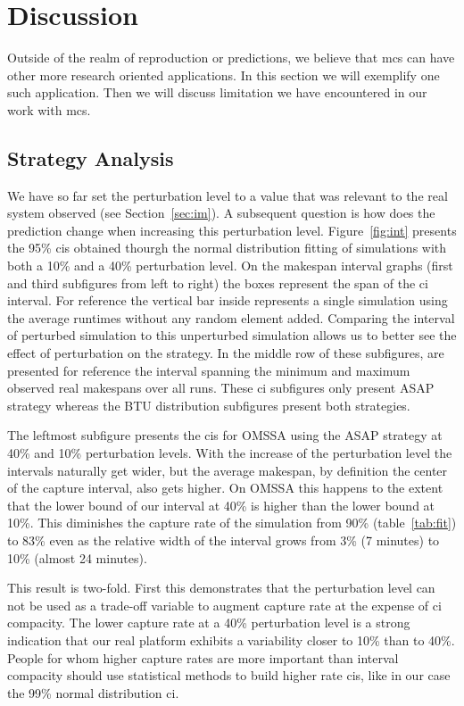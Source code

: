 \documentclass[10pt,conference,compsocconf]{IEEEtran}
\begin{document}
\section{Discussion}
\label{sec:disc}
Outside of the realm of reproduction or predictions, we believe that \ac{mcs}
can have other more research oriented applications. In this section we will
exemplify one such application. Then we will discuss limitation we have
encountered in our work with \ac{mcs}.

\subsection{Strategy Analysis}\label{sec:sa}

We have so  far set the perturbation level  to a value that was  relevant to the
real system observed  (see Section~\ref{sec:im}).  A subsequent  question is how
does   the  prediction   change   when  increasing   this  perturbation   level.
Figure~\ref{fig:int} presents the 95\% \acp{ci} obtained thourgh the normal
distribution fitting of simulations with both a 10\%
and a 40\% perturbation  level. On the makespan interval graphs  (first and third
subfigures  from left  to right)  the boxes  represent the  span of the \ac{ci}
interval. For reference  the vertical bar inside represents  a single simulation
using  the average  runtimes without  any random  element added.   Comparing the
interval of  perturbed simulation  to this unperturbed  simulation allows  us to
better see  the effect of  perturbation on the strategy.   In the middle  row of
these subfigures, are presented for  reference the interval spanning the minimum
and maximum  observed real  makespans over all  runs.  These  \ac{ci} subfigures
only present ASAP strategy whereas  the BTU distribution subfigures present both
strategies.

The leftmost subfigure presents the \acp{ci} for OMSSA using the ASAP strategy at
40\% and 10\% perturbation levels. With the increase of the perturbation level
the intervals naturally get wider, but the average makespan, by definition the
center of the capture interval, also gets higher. On OMSSA this happens to the
extent that the lower bound of our interval at 40\% is higher than the lower
bound at 10\%. This diminishes the capture rate of the simulation from 90\%
(table~\ref{tab:fit}) to 83\% even as the relative width of the interval grows
from 3\% (7 minutes) to 10\% (almost 24 minutes).

This result is two-fold. First this demonstrates that the perturbation level can
not be used as a trade-off variable to augment capture rate at the expense of
\ac{ci} compacity. The lower capture rate at a 40\% perturbation level is a
strong indication that our real platform exhibits a variability closer to
10\% than to 40\%. People for whom higher capture rates are more important than
interval compacity should use statistical methods to build higher rate \acp{ci},
like in our case the 99\% normal distribution \ac{ci}.
\end{document}
